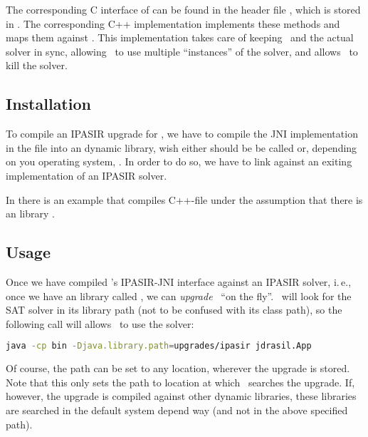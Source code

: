 \documentclass[a4paper, ukenglish, twoside, openright]{jdrasilmanual}
\begin{document}
The corresponding C interface of  can be found
in the header file , which is
stored in . The
corresponding C++ implementation
 implements these methods and
maps them against . This implementation takes care of
keeping \Jdrasil\ and the actual solver in sync, allowing \Jdrasil\ to
use multiple ``instances'' of the solver, and allows \Jdrasil\ to kill
the solver. 

\subsection{Installation} 
To compile an IPASIR upgrade for \Jdrasil, we have to compile the JNI
implementation in the file 
into an dynamic library, wish either should be be called
 or, depending on you
operating system,
. In order to do so, we
have to link against an exiting implementation of an IPASIR solver.

In  there is an example  that compiles
C++-file under the assumption that there
is an library .


\subsection{Usage}
Once we have compiled \Jdrasil's IPASIR-JNI interface against an
IPASIR solver, i.\,e., once we have an library called
, we can \emph{upgrade}
\Jdrasil\ ``on the fly''. \Jdrasil\ will look for the SAT solver in
its library path (not to be confused with its class path), so the
following call will allows \Jdrasil\ to use the solver:
\begin{lstlisting}[language=bash]
  java -cp bin -Djava.library.path=upgrades/ipasir jdrasil.App
\end{lstlisting}
Of course, the path can be set to any location, wherever the upgrade
is stored. Note that this only sets the path to location at which
\Jdrasil\ searches the upgrade. If, however, the upgrade is compiled
against other dynamic libraries, these libraries are searched in the
default system depend way (and not in the above specified path).



\end{document}

